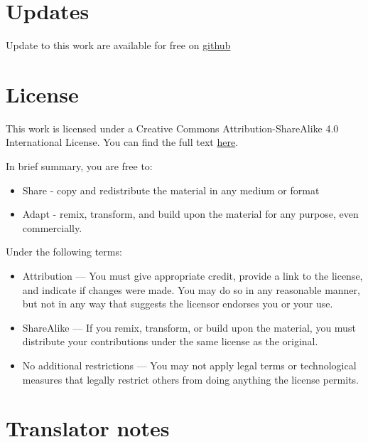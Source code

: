 \section{Updates}

Update to this work are available for free on \href{https://github.com/cybojanek/fsi-cantonese/releases}{github}

\section{License}

This work is licensed under a Creative Commons Attribution-ShareAlike 4.0 International License. You can find the full text \href{https://creativecommons.org/licenses/by-sa/4.0/}{here}.

In brief summary, you are free to:

\begin{itemize}
	\item Share - copy and redistribute the material in any medium or format
	\item Adapt - remix, transform, and build upon the material for any purpose, even commercially.
\end{itemize}

Under the following terms:

\begin{itemize}
	\item Attribution — You must give appropriate credit, provide a link to the license, and indicate if changes were made. You may do so in any reasonable manner, but not in any way that suggests the licensor endorses you or your use.
	\item ShareAlike — If you remix, transform, or build upon the material, you must distribute your contributions under the same license as the original.
	\item No additional restrictions — You may not apply legal terms or technological measures that legally restrict others from doing anything the license permits.
\end{itemize}

\section{Translator notes}

